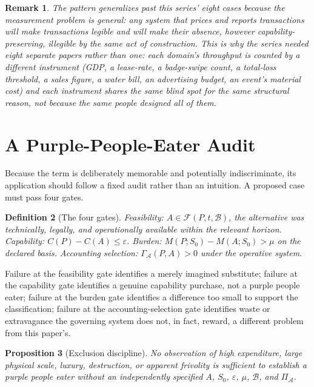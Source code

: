 \documentclass[11pt]{article}
\newtheorem{definition}{Definition}[section]
\newtheorem{proposition}[definition]{Proposition}
\newtheorem{remark}[definition]{Remark}
\begin{document}
\begin{remark}
The pattern generalizes past this series' eight cases because the measurement problem is general: any system that prices and reports transactions will make transactions legible and will make their absence, however capability-preserving, illegible by the same act of construction. This is why the series needed eight separate papers rather than one: each domain's throughput is counted by a different instrument (GDP, a lease-rate, a badge-swipe count, a total-loss threshold, a sales figure, a water bill, an advertising budget, an event's material cost) and each instrument shares the same blind spot for the same structural reason, not because the same people designed all of them.
\end{remark}

\section{A Purple-People-Eater Audit}

Because the term is deliberately memorable and potentially indiscriminate, its application should follow a fixed audit rather than an intuition. A proposed case must pass four gates.

\begin{definition}[The four gates]
\emph{Feasibility}: $A \in \mathcal{F}(P, t, \mathcal{B})$, the alternative was technically, legally, and operationally available within the relevant horizon. \emph{Capability}: $C(P) - C(A) \leq \varepsilon$. \emph{Burden}: $M(P; S_0) - M(A; S_0) > \mu$ on the declared basis. \emph{Accounting selection}: $\Gamma_{\mathcal{A}}(P, A) > 0$ under the operative system.
\end{definition}

Failure at the feasibility gate identifies a merely imagined substitute; failure at the capability gate identifies a genuine capability purchase, not a purple people eater; failure at the burden gate identifies a difference too small to support the classification; failure at the accounting-selection gate identifies waste or extravagance the governing system does not, in fact, reward, a different problem from this paper's.

\begin{proposition}[Exclusion discipline]
No observation of high expenditure, large physical scale, luxury, destruction, or apparent frivolity is sufficient to establish a purple people eater without an independently specified $A$, $S_0$, $\varepsilon$, $\mu$, $\mathcal{B}$, and $\Pi_{\mathcal{A}}$.
\end{proposition}
\end{document}
